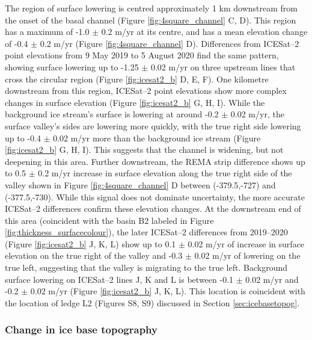 \newpage
The region of surface lowering is centred  approximately 1 km downstream from the onset of the basal channel (Figure \ref{fig:4square_channel} C, D). This region has a maximum of -1.0 $\pm$ 0.2 m/yr at its centre, and has a mean elevation change of -0.4 $\pm$ 0.2 m/yr (Figure \ref{fig:4square_channel} D).  Differences from ICESat--2 point elevations from 9 May 2019 to 5 August 2020 find the same pattern, showing surface lowering up to -1.25 $\pm$ 0.02 m/yr on three upstream lines that cross the circular region (Figure \ref{fig:icesat2_b} D, E, F). 
One kilometre downstream from this region, ICESat--2 point elevations show more complex changes in surface elevation (Figure \ref{fig:icesat2_b} G, H, I). While the background ice stream's surface is lowering at around -0.2 $\pm$ 0.02 m/yr, the surface valley's sides are lowering more quickly, with the true right side  lowering up to -0.4 $\pm$ 0.02 m/yr more than the background ice stream (Figure \ref{fig:icesat2_b} G, H, I).  This suggests that the channel is widening, but not deepening in this area.
Further downstream, the REMA strip difference shows up to 0.5 $\pm$ 0.2 m/yr increase in surface elevation along the true right side of the valley shown in Figure \ref{fig:4square_channel} D between (-379.5,-727) and (-377.5,-730). While this signal does not dominate uncertainty, the more accurate ICESat--2 differences confirm these elevation changes.  At the downstream end of this area (coincident with the basin B2 labeled in Figure \ref{fig:thickness_surfacecolour}), the later ICESat--2 differences from 2019--2020 (Figure \ref{fig:icesat2_b} J, K, L) show up to 0.1 $\pm$ 0.02 m/yr of increase in surface elevation on the true right of the valley and -0.3 $\pm$ 0.02 m/yr of lowering on the true left, suggesting that the valley is migrating to the true left. Background surface lowering on ICESat--2 lines J, K and L is between -0.1 $\pm$ 0.02 m/yr and -0.2 $\pm$ 0.02 m/yr (Figure \ref{fig:icesat2_b} J, K, L). This location is coincident with the location of ledge L2 (Figures S8, S9) discussed in Section \ref{sec:icebasetopog}. 
 

\subsubsection{Change in ice base topography} \label{sec:changeinbase}


